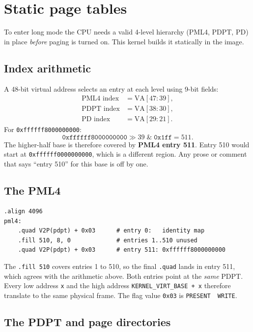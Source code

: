 \section{Static page tables}

To enter long mode the CPU needs a valid 4-level hierarchy (PML4, PDPT, PD) in place \emph{before} paging is turned on. This kernel builds it statically in the image.

\subsection{Index arithmetic}

A 48-bit virtual address selects an entry at each level using 9-bit fields:
\[
\begin{aligned}
\text{PML4 index} &= \text{VA}[47{:}39],\\
\text{PDPT index} &= \text{VA}[38{:}30],\\
\text{PD index}   &= \text{VA}[29{:}21].
\end{aligned}
\]
For \texttt{0xffffff8000000000}:
\[
\texttt{0xffffff8000000000} \gg 39 \;\&\; \texttt{0x1ff} = 511.
\]
The higher-half base is therefore covered by \textbf{PML4 entry 511}. Entry 510 would start at \texttt{0xffffff0000000000}, which is a different region. Any prose or comment that says ``entry 510'' for this base is off by one.

\subsection{The PML4}

\begin{lstlisting}[language=gas]
.align 4096
pml4:
    .quad V2P(pdpt) + 0x03      # entry 0:   identity map
    .fill 510, 8, 0             # entries 1..510 unused
    .quad V2P(pdpt) + 0x03      # entry 511: 0xffffff8000000000
\end{lstlisting}

The \texttt{.fill\ 510} covers entries 1 to 510, so the final \texttt{.quad} lands in entry 511, which agrees with the arithmetic above. Both entries point at the \emph{same} PDPT. Every low address \texttt{x} and the high address \texttt{KERNEL\_VIRT\_BASE\ +\ x} therefore translate to the same physical frame. The flag value \texttt{0x03} is \texttt{PRESENT\ \textbar{}\ WRITE}.

\subsection{The PDPT and page directories}

